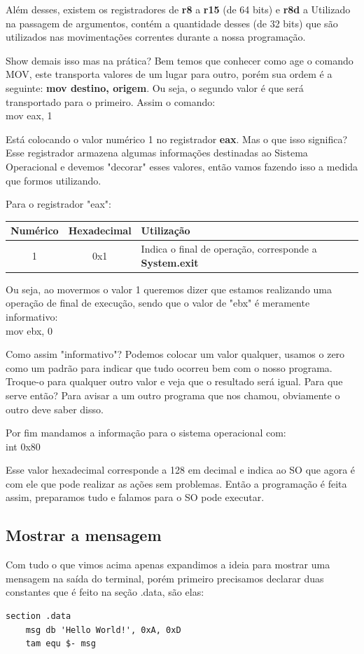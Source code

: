 Além desses, existem os registradores de \textbf{r8} a \textbf{r15} (de 64 bits) e \textbf{r8d} a Utilizado na passagem de argumentos, contém a quantidade desses (de 32 bits) que são utilizados nas movimentações correntes durante a nossa programação.

Show demais isso mas na prática? Bem temos que conhecer como age o comando MOV, este transporta valores de um lugar para outro, porém sua ordem é a seguinte: \textbf{mov destino, origem}. Ou seja, o segundo valor é que será transportado para o primeiro. Assim o comando: \\
{\ttfamily mov eax, 1}

Está colocando o valor numérico 1 no registrador \textbf{eax}. Mas o que isso significa? Esse registrador armazena algumas informações destinadas ao Sistema Operacional e devemos "decorar" esses valores, então vamos fazendo isso a medida que formos utilizando.

Para o registrador "eax":
\begin{table}[H]
	\centering 
	\begin{tabular}{c | c | l }
		\textbf{Numérico} & \textbf{Hexadecimal} & \textbf{Utilização} \\ \hline
		1 & 0x1 & Indica o final de operação, corresponde a \textbf{System.exit}
	\end{tabular}
\end{table}

Ou seja, ao movermos o valor 1 queremos dizer que estamos realizando uma operação de final de execução, sendo que o valor de "ebx" é meramente informativo: \\
{\ttfamily mov ebx, 0}

Como assim "informativo"? Podemos colocar um valor qualquer, usamos o zero como um padrão para indicar que tudo ocorreu bem com o nosso programa. Troque-o para qualquer outro valor e veja que o resultado será igual. Para que serve então? Para avisar a um outro programa que nos chamou, obviamente o outro deve saber disso.

Por fim mandamos a informação para o sistema operacional com: \\
{\ttfamily int 0x80}

Esse valor hexadecimal corresponde a 128 em decimal e indica ao SO que agora é com ele que pode realizar as ações sem problemas. Então a programação é feita assim, preparamos tudo e falamos para o SO pode executar.

\subsection{Mostrar a mensagem}
Com tudo o que vimos acima apenas expandimos a ideia para mostrar uma mensagem na saída do terminal, porém primeiro precisamos declarar duas constantes que é feito na seção .data, são elas: \\
\begin{lstlisting}[]
section .data
	msg db 'Hello World!', 0xA, 0xD
	tam equ $- msg
\end{lstlisting}

